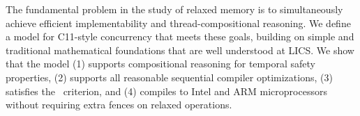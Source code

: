 The fundamental problem in the study of relaxed memory is to simultaneously achieve efficient implementability and thread-compositional reasoning.  We define a model for C11-style concurrency that meets these goals, building on simple and traditional mathematical  foundations that are well understood at LICS.   We show that the model
(1) supports compositional reasoning for temporal safety properties,
(2) supports all reasonable sequential compiler optimizations, 
(3) satisfies the \drfsc\ criterion, and
(4) compiles to Intel and ARM microprocessors without requiring extra fences on relaxed operations.
